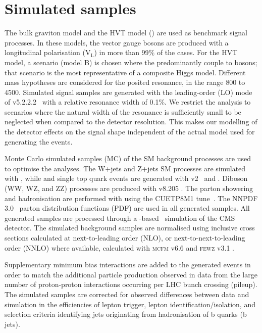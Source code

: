 \section{Simulated samples}
\label{sec:simulatedsamples}

The bulk graviton model 
and the HVT model (\PWpr{}) are used as benchmark signal processes.
In these models, the vector gauge bosons are produced with a longitudinal polarisation ($\mathrm{V}_{\mathrm{L}}$) in more than 99\% of the cases.
For the HVT model, a scenario (model B) is chosen where the \PWpr{} predominantly couple to bosons; that scenario is the most representative of a composite Higgs model.
Different mass hypotheses are considered for the posited resonance, in the range 800 to 4500\GeV.
Simulated signal samples are generated with the leading-order (LO) mode of \amcatnlo{} v5.2.2.2~\cite{Alwall:2014hca} with a relative resonance width of 0.1\%.
We restrict the analysis to scenarios where the natural width of the resonance is sufficiently small to be neglected when compared to the detector resolution.
This makes our modelling of the detector effects on the signal shape independent of the actual model used for generating the events.

Monte Carlo simulated samples (MC) of the SM background processes are used to optimise the analyses.
The W+jets and Z+jets SM processes are simulated with \amcatnlo{},
while \ttbar and single top quark events are generated with \POWHEG v2~\cite{Nason:2004rx,Frixione:2007vw,Alioli:2010xd,Alioli:2009je,Re:2010bp,Alioli:2011as}
and \amcatnlo{}. %
Diboson (WW, WZ, and ZZ) processes are produced with \PYTHIA v8.205 \cite{Sjostrand:2006za,Sjostrand:2007gs}. 
The parton showering and hadronisation are performed with \PYTHIA using the CUETP8M1 tune~\cite{Skands:2014pea,CMS-PAS-GEN-14-001}.
The NNPDF 3.0~\cite{Ball:2011mu} parton distribution functions (PDF) are used in all generated samples. 
All generated samples are processed through a \GEANTfour-based~\cite{Agostinelli:2002hh} simulation of the CMS detector. 
The simulated background samples are normalised using inclusive cross sections calculated at next-to-leading order (NLO), or
next-to-next-to-leading order (NNLO) where available, calculated with \textsc{mcfm} v6.6 \cite{MCFM:VJets,MCFM:VV,Campbell:2012uf,MCFM:SingleTop} and \textsc{fewz} v3.1 \cite{FEWZ3}.

Supplementary minimum bias interactions are added to the generated events in order to match the additional particle production observed in data from the large number of proton-proton interactions occurring per LHC bunch crossing (pileup). The simulated samples are corrected for observed differences between data and simulation in the efficiencies of lepton trigger, lepton identification/isolation, and selection criteria identifying jets originating from hadronisation of b quarks (b jets).
